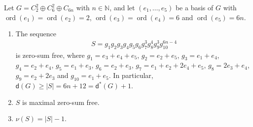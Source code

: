 \documentclass[10pt,a4paper]{amsart}
\DeclareMathOperator{\ord}{ord}
\newcommand{\N}{\mathbb N}
\begin{document}
\begin{theorem} \label{6.5}
Let $G = C_2^2 \oplus C_6^2 \oplus C_{6n}$ with $n \in \N$, and let $(e_1, \ldots, e_5)$ be a basis of $G$ with $\ord (e_1) = \ord
(e_2) = 2$, $\ord (e_3) = \ord (e_4) = 6$ and $\ord (e_5) = 6n$.
\begin{enumerate}
\item The sequence 
      \begin{align*}
      S =   g_1 g_2 g_3 g_4 g_5 g_6  g_7^3 g_8^4 g_9^3 g_{10}^{6n-4} 
      \end{align*}
      is zero-sum free, where $g_1 = e_3+e_4+e_5$, $g_2 = e_2+e_5$, $g_3 =
      e_1+e_4$, $g_4 = e_2+e_4$, $g_5 = e_1+e_3$, $g_6=e_2+e_3$, $g_7 =
      e_1+e_2+2e_4+e_5$, $g_8 = 2e_3+e_4$, $g_9 = e_2+2e_3$ and $g_{10} =
      e_1+e_5$.  In particular, $\mathsf d (G) \ge |S|  = 6n+12 = \mathsf d^* (G)+1$.
      
\item $S$ is maximal zero-sum free.

\item $\nu (S) = |S| -1$.
\end{enumerate}      
\end{theorem}
\end{document}
